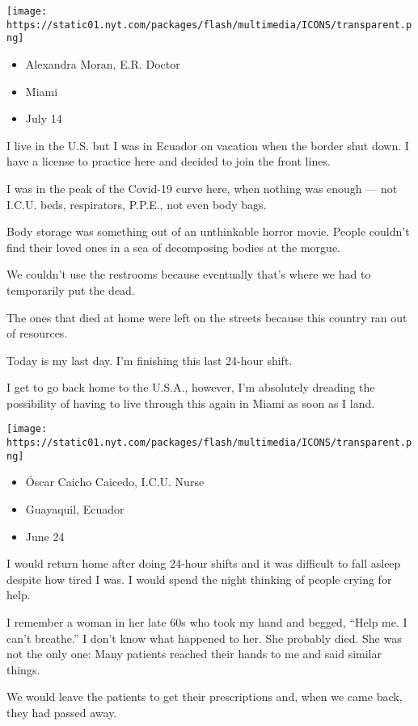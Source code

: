 \texttt{[image: https://static01.nyt.com/packages/flash/multimedia/ICONS/transparent.png]}

\begin{itemize}
\tightlist
\item
  Alexandra Moran, E.R. Doctor
\item
  Miami
\item
  July 14
\end{itemize}

I live in the U.S. but I was in Ecuador on vacation when the border shut
down. I have a license to practice here and decided to join the front
lines.

I was in the peak of the Covid-19 curve here, when nothing was enough
--- not I.C.U. beds, respirators, P.P.E., not even body bags.

Body storage was something out of an unthinkable horror movie. People
couldn't find their loved ones in a sea of decomposing bodies at the
morgue.

We couldn't use the restrooms because eventually that's where we had to
temporarily put the dead.

The ones that died at home were left on the streets because this country
ran out of resources.

Today is my last day. I'm finishing this last 24-hour shift.

I get to go back home to the U.S.A., however, I'm absolutely dreading
the possibility of having to live through this again in Miami as soon as
I land.

\texttt{[image: https://static01.nyt.com/packages/flash/multimedia/ICONS/transparent.png]}

\begin{itemize}
\tightlist
\item
  Óscar Caicho Caicedo, I.C.U. Nurse
\item
  Guayaquil, Ecuador
\item
  June 24
\end{itemize}

I would return home after doing 24-hour shifts and it was difficult to
fall asleep despite how tired I was. I would spend the night thinking of
people crying for help.

I remember a woman in her late 60s who took my hand and begged, ``Help
me. I can't breathe.'' I don't know what happened to her. She probably
died. She was not the only one: Many patients reached their hands to me
and said similar things.

We would leave the patients to get their prescriptions and, when we came
back, they had passed away.

